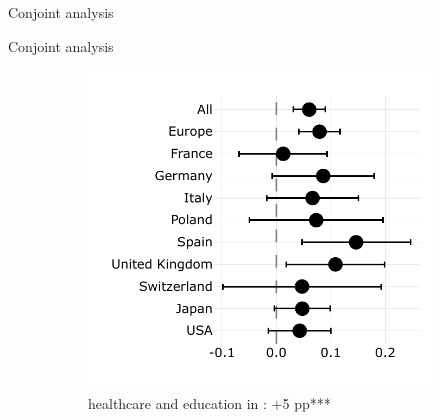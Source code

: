 \documentclass[aspectratio=169,xcolor=dvipsnames, 11pt,mathserif]{beamer}
\begin{document}
\begin{frame}{Conjoint analysis}
\end{frame}

\begin{frame}{Conjoint analysis} 
    \begin{figure}
\caption{ the  political  of containing the following policy%
} \vspace{-.3cm}
\begin{subfigure}{.48\textwidth}
  \caption[]{ healthcare and education in : +5 pp***} \vspace{-.3cm}
  \includegraphics[width=\textwidth]{../figures/country_comparison/program_preferred_by_millionaire_tax_in_program.pdf}
\end{subfigure} \quad
\begin{subfigure}{.48\textwidth}
  \caption[]{}\vspace{-.3cm}

\end{subfigure}
\end{figure}
\end{frame}
\end{document}
